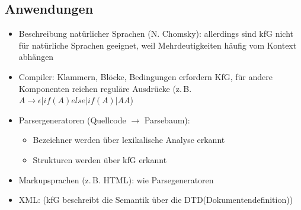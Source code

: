 \subsection{Anwendungen}
\begin{itemize}\itemsep0em
	\item Beschreibung natürlicher Sprachen (N. Chomsky): allerdings sind kfG nicht für natürliche Sprachen geeignet, weil Mehrdeutigkeiten häufig vom Kontext abhängen
	\item Compiler: Klammern, Blöcke, Bedingungen erfordern KfG, für andere Komponenten reichen reguläre Ausdrücke (z.\,B. $A \rightarrow \epsilon | if (A) else | if (A) | AA$)
	\item Parsergeneratoren (Quellcode $\rightarrow$ Parsebaum):
	\begin{itemize}
		\item Bezeichner werden über lexikalische Analyse erkannt
		\item Strukturen werden über kfG erkannt
	\end{itemize}
	\item Markupsprachen (z.\,B. HTML): wie Parsegeneratoren
	\item XML: (kfG beschreibt die Semantik über die DTD(Dokumentendefinition))
\end{itemize}
